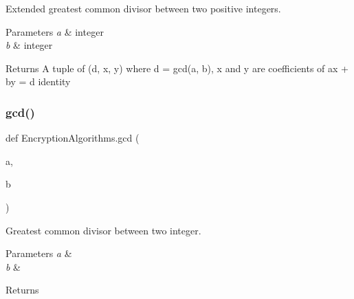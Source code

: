 Extended greatest common divisor between two positive integers. 


\begin{DoxyParams}{Parameters}
{\em a} & integer \\
\hline
{\em b} & integer\\
\hline
\end{DoxyParams}
\begin{DoxyReturn}{Returns}
A tuple of (d, x, y) where d = gcd(a, b), x and y are coefficients of ax + by = d identity 
\end{DoxyReturn}
\mbox{\label{namespaceEncryptionAlgorithms_ac6020cd3bf4adee2c1d7e325d0218630}} 
\subsubsection{\texorpdfstring{gcd()}{gcd()}}
{\footnotesize\ttfamily def Encryption\+Algorithms.\+gcd (\begin{DoxyParamCaption}\item[{}]{a,  }\item[{}]{b }\end{DoxyParamCaption})}



Greatest common divisor between two integer. 


\begin{DoxyParams}{Parameters}
{\em a} & \\
\hline
{\em b} & \\
\hline
\end{DoxyParams}
\begin{DoxyReturn}{Returns}

\end{DoxyReturn}

